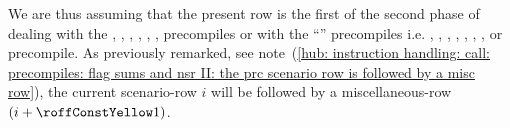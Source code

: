 \begin{center}
\end{center}
We are thus assuming that the present row is the first of the second phase of dealing with the 
\instEcrecover{},
\instShaTwo{},
\instRipemd{},
\instIdentity{},
\instEcadd{},
\instEcmul{},
\instEcpairing{}
precompiles or with the ``\blsDataMod{}'' precompiles i.e.
\instPointEvaluation{},
\instBlsGOneAdd{},
\instBlsGOneMsm{},
\instBlsGTwoAdd{},
\instBlsGTwoMsm{},
\instBlsPairingCheck{},
\instBlsMapFpToGOne{},
\instBlsMapFpTwoToGTwo{} or
\instPVerify{} precompile.
As previously remarked,
see note~(\ref{hub: instruction handling: call: precompiles: flag sums and nsr II: the prc scenario row is followed by a misc row}),
the current scenario-row $i$ will be followed by a miscellaneous-row $(i + \prcCommonMiscRowOffset)$.

